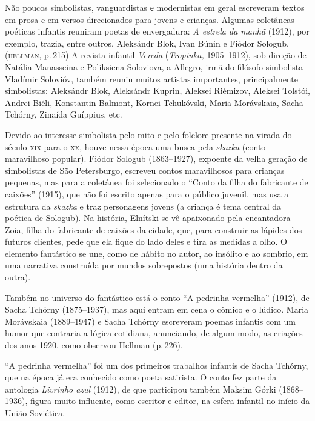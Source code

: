 Não poucos simbolistas, vanguardistas е modernistas em geral escreveram
textos em prosa e em versos direcionados para jovens e crianças. Algumas
coletâneas poéticas infantis reuniram poetas de envergadura: \emph{A
estrela da manhã} (1912), por exemplo, trazia, entre outros,
Aleksándr Blok, Ivan Búnin e Fiódor Sologub. (\textsc{hellman}, p.\,215) A revista
infantil \emph{Vereda} (\emph{Tropinka,} 1905--1912), sob direção de
Natália Manasseina e Poliksiena Soloviova, a Allegro, irmã do filósofo simbolista Vladímir Solovióv,
também reuniu muitos artistas importantes, principalmente simbolistas:
Aleksándr Blok, Aleksándr Kuprin, Aleksei Riémizov, Aleksei Tolstói,
Andrei Biéli, Konstantin Balmont, Kornei Tchukóvski, Maria Morávskaia,
Sacha Tchórny, Zinaída Guíppius, etc.

Devido ao interesse simbolista pelo mito e pelo folclore presente na
virada do século \textsc{xix} para o \textsc{xx}, houve nessa época uma busca pela
\emph{skazka} (conto maravilhoso popular). Fiódor Sologub (1863--1927),
expoente da velha geração de simbolistas de São Petersburgo, escreveu
contos maravilhosos para crianças pequenas, mas para a coletânea foi
selecionado o ``Conto da filha do fabricante de caixões'' (1915),
que não foi escrito apenas para o público juvenil, mas usa a estrutura
da \emph{skazka} e traz personagens jovens (a criança é tema central da
poética de Sologub). Na história, Elnítski se vê apaixonado pela
encantadora Zoia, filha do fabricante de caixões da cidade, que, para
construir as lápides dos futuros clientes, pede que ela fique do lado
deles e tira as medidas a olho. O elemento fantástico se une, como de
hábito no autor, ao insólito e ao sombrio, em uma narrativa construída
por mundos sobrepostos (uma história dentro da outra).

Também no universo do fantástico está o conto ``A pedrinha vermelha''
(1912), de Sacha Tchórny (1875--1937), mas aqui entram em cena o
cômico e o lúdico. Maria Morávskaia (1889--1947) e Sacha Tchórny
escreveram poemas infantis com um humor que contraria a lógica
cotidiana, anunciando, de algum modo, as criações dos anos 1920, como
observou Hellman (p.\,226).

``A pedrinha vermelha'' foi um dos primeiros trabalhos infantis de Sacha
Tchórny, que na época já era conhecido como poeta satirista. O conto fez
parte da antologia \emph{Livrinho azul} (1912), de que participou também
Maksim Górki (1868--1936), figura muito influente, como escritor e
editor, na esfera infantil no início da União Soviética.

